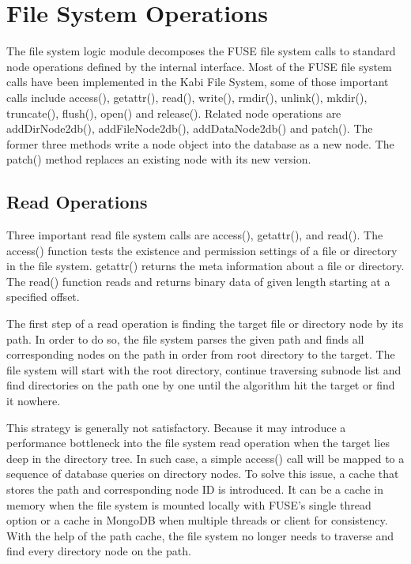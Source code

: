 \section{File System Operations}

    The file system logic module decomposes the FUSE file system calls to standard node operations defined by the internal interface. Most of the FUSE file system calls have been implemented in the Kabi File System, some of those important calls include access(), getattr(), read(), write(), rmdir(), unlink(), mkdir(), truncate(), flush(), open() and release(). Related node operations are addDirNode2db(), addFileNode2db(), addDataNode2db() and patch(). The former three methods write a node object into the database as a new node. The patch() method replaces an existing node with its new version.

\subsection{Read Operations}

    Three important read file system calls are access(), getattr(), and read(). The access() function tests the existence and permission settings of a file or directory in the file system. getattr() returns the meta information about a file or directory. The read() function reads and returns binary data of given length starting at a specified offset.

    The first step of a read operation is finding the target file or directory node by its path. In order to do so, the file system parses the given path and finds all corresponding nodes on the path in order from root directory to the target. The file system will start with the root directory, continue traversing subnode list and find directories on the path one by one until the algorithm hit the target or find it nowhere.

    This strategy is generally not satisfactory. Because it may introduce a performance bottleneck into the file system read operation when the target lies deep in the directory tree. In such case, a simple access() call will be mapped to a sequence of database queries on directory nodes. To solve this issue, a cache that stores the path and corresponding node ID is introduced. It can be a cache in memory when the file system is mounted locally with FUSE's single thread option or a cache in MongoDB when multiple threads or client for consistency. With the help of the path cache, the file system no longer needs to traverse and find every directory node on the path.

